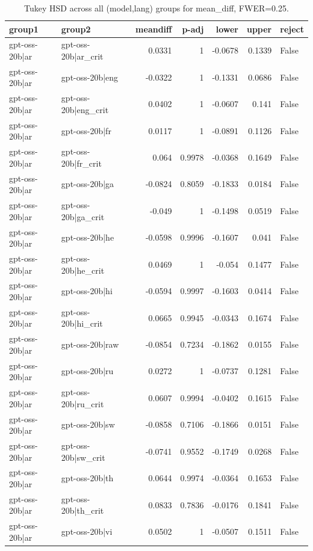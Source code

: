 \begin{table}
\caption{Tukey HSD across all (model,lang) groups for mean_diff, FWER=0.25.}
\label{tab:tukey_all_models_all_langs_mean_diff}
\begin{tabular}{l l r r r r l}
\toprule
group1 & group2 & meandiff & p-adj & lower & upper & reject \\
\midrule
gpt-oss-20b|ar & gpt-oss-20b|ar_crit & 0.0331 & 1 & -0.0678 & 0.1339 & False \\
gpt-oss-20b|ar & gpt-oss-20b|eng & -0.0322 & 1 & -0.1331 & 0.0686 & False \\
gpt-oss-20b|ar & gpt-oss-20b|eng_crit & 0.0402 & 1 & -0.0607 & 0.141 & False \\
gpt-oss-20b|ar & gpt-oss-20b|fr & 0.0117 & 1 & -0.0891 & 0.1126 & False \\
gpt-oss-20b|ar & gpt-oss-20b|fr_crit & 0.064 & 0.9978 & -0.0368 & 0.1649 & False \\
gpt-oss-20b|ar & gpt-oss-20b|ga & -0.0824 & 0.8059 & -0.1833 & 0.0184 & False \\
gpt-oss-20b|ar & gpt-oss-20b|ga_crit & -0.049 & 1 & -0.1498 & 0.0519 & False \\
gpt-oss-20b|ar & gpt-oss-20b|he & -0.0598 & 0.9996 & -0.1607 & 0.041 & False \\
gpt-oss-20b|ar & gpt-oss-20b|he_crit & 0.0469 & 1 & -0.054 & 0.1477 & False \\
gpt-oss-20b|ar & gpt-oss-20b|hi & -0.0594 & 0.9997 & -0.1603 & 0.0414 & False \\
gpt-oss-20b|ar & gpt-oss-20b|hi_crit & 0.0665 & 0.9945 & -0.0343 & 0.1674 & False \\
gpt-oss-20b|ar & gpt-oss-20b|raw & -0.0854 & 0.7234 & -0.1862 & 0.0155 & False \\
gpt-oss-20b|ar & gpt-oss-20b|ru & 0.0272 & 1 & -0.0737 & 0.1281 & False \\
gpt-oss-20b|ar & gpt-oss-20b|ru_crit & 0.0607 & 0.9994 & -0.0402 & 0.1615 & False \\
gpt-oss-20b|ar & gpt-oss-20b|sw & -0.0858 & 0.7106 & -0.1866 & 0.0151 & False \\
gpt-oss-20b|ar & gpt-oss-20b|sw_crit & -0.0741 & 0.9552 & -0.1749 & 0.0268 & False \\
gpt-oss-20b|ar & gpt-oss-20b|th & 0.0644 & 0.9974 & -0.0364 & 0.1653 & False \\
gpt-oss-20b|ar & gpt-oss-20b|th_crit & 0.0833 & 0.7836 & -0.0176 & 0.1841 & False \\
gpt-oss-20b|ar & gpt-oss-20b|vi & 0.0502 & 1 & -0.0507 & 0.1511 & False \\

\end{tabular}
\end{table}
